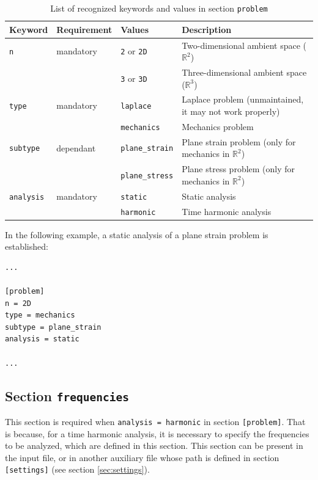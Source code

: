 \documentclass[a4paper,fleqn]{book}
\begin{document}
\begin{table}
\centering
{\footnotesize
\begin{tabular}{llll}
\textbf{Keyword} & \textbf{Requirement} & \textbf{Values} & \textbf{Description} \\
\midrule
\texttt{n} & mandatory & \texttt{2} or \texttt{2D} & Two-dimensional ambient space ($\mathbb{R}^2$)   \\
           &           & \texttt{3} or \texttt{3D} & Three-dimensional ambient space ($\mathbb{R}^3$) \\
\midrule
\texttt{type} & mandatory & \texttt{laplace} & Laplace problem (unmaintained, it may not work properly)     \\
              &           & \texttt{mechanics} & Mechanics problem \\
\midrule
\texttt{subtype} & dependant & \texttt{plane\_strain} & Plane strain problem (only for mechanics in $\mathbb{R}^2$) \\
                 &           & \texttt{plane\_stress} & Plane stress problem (only for mechanics in $\mathbb{R}^2$) \\          
\midrule
\texttt{analysis} & mandatory & \texttt{static}   & Static analysis        \\
                  &           & \texttt{harmonic} & Time harmonic analysis \\    
\end{tabular}
\caption{List of recognized keywords and values in section \texttt{problem}}
\label{tab:problem}
}
\end{table}

In the following example, a static analysis of a plane strain problem is established:
\begin{Verbatim}[frame=single, fontsize=\small, label=input.dat]
...

[problem]
n = 2D
type = mechanics
subtype = plane_strain
analysis = static

...
\end{Verbatim}

\subsection{Section \texttt{frequencies}}

This section is required when \texttt{analysis = harmonic} in section \texttt{[problem]}. That is because, for a time harmonic analysis, it is necessary to specify the frequencies to be analyzed, which are defined in this section. This section can be present in the input file, or in another auxiliary file whose path is defined in section  \texttt{[settings]} (see section \ref{sec:settings}).
\end{document}
